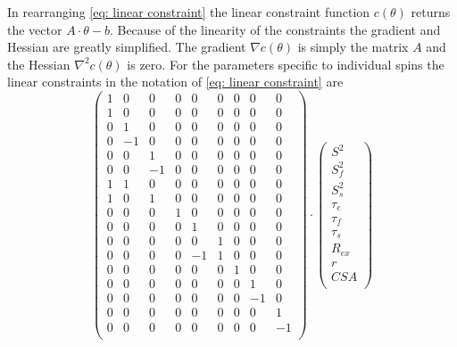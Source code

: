 \begin{htmlonly}
\begin{htmlonly}
In rearranging \eqref{eq: linear constraint} the linear constraint function $c(\theta)$ returns the vector $A \cdot \theta - b$.  Because of the linearity of the constraints the gradient and Hessian are greatly simplified.  The gradient $\nabla c(\theta)$ is simply the matrix $A$ and the Hessian $\nabla^2 c(\theta)$ is zero.  For the parameters specific to individual spins the linear constraints in the notation of \eqref{eq: linear constraint} are
\begin{equation}
    \begin{pmatrix}
        1 & 0 & 0 & 0 & 0 & 0 & 0 & 0 & 0 \\
        1 & 0 & 0 & 0 & 0 & 0 & 0 & 0 & 0 \\
        0 & 1 & 0 & 0 & 0 & 0 & 0 & 0 & 0 \\
        0 &-1 & 0 & 0 & 0 & 0 & 0 & 0 & 0 \\
        0 & 0 & 1 & 0 & 0 & 0 & 0 & 0 & 0 \\
        0 & 0 &-1 & 0 & 0 & 0 & 0 & 0 & 0 \\
        1 & 1 & 0 & 0 & 0 & 0 & 0 & 0 & 0 \\
        1 & 0 & 1 & 0 & 0 & 0 & 0 & 0 & 0 \\
        0 & 0 & 0 & 1 & 0 & 0 & 0 & 0 & 0 \\
        0 & 0 & 0 & 0 & 1 & 0 & 0 & 0 & 0 \\
        0 & 0 & 0 & 0 & 0 & 1 & 0 & 0 & 0 \\
        0 & 0 & 0 & 0 &-1 & 1 & 0 & 0 & 0 \\
        0 & 0 & 0 & 0 & 0 & 0 & 1 & 0 & 0 \\
        0 & 0 & 0 & 0 & 0 & 0 & 0 & 1 & 0 \\
        0 & 0 & 0 & 0 & 0 & 0 & 0 &-1 & 0 \\
        0 & 0 & 0 & 0 & 0 & 0 & 0 & 0 & 1 \\
        0 & 0 & 0 & 0 & 0 & 0 & 0 & 0 &-1 \\
    \end{pmatrix}
    \cdot
    \begin{pmatrix}
        S^2 \\
        S^2_f \\
        S^2_s \\
        \tau_e \\
        \tau_f \\
        \tau_s \\
        R_{ex} \\
         r \\
        CSA \\

\end{pmatrix}
\end{equation}
\end{htmlonly}
\end{htmlonly}
